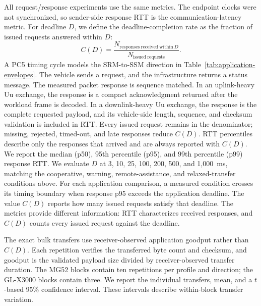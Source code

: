 All request/response experiments use the same metrics. The endpoint clocks were not
synchronized, so sender-side response RTT is the
communication-latency metric. For deadline $D$, we define the deadline-completion
rate as the fraction of issued requests answered within $D$:
\begin{equation}
 C(D)=
 \frac{N_{\mathrm{responses\ received\ within}\ D}}
 {N_{\mathrm{issued\ requests}}}.
 \label{eq:deadline-completion}
\end{equation}
A PC5 timing cycle models the SRM-to-SSM direction in
Table~\ref{tab:application-envelopes}. The vehicle sends a request, and the
infrastructure returns a status message. The measured packet response is
sequence matched. In an uplink-heavy Uu exchange, the response is a compact
acknowledgment returned after the workload frame is decoded. In a
downlink-heavy Uu exchange, the response is the complete requested payload, and
its vehicle-side length, sequence, and checksum validation is included in RTT.
Every issued request remains in the denominator; missing,
rejected, timed-out, and late responses reduce $C(D)$. RTT
percentiles describe only the responses that arrived and are always reported
with $C(D)$. We report the median (p50), 95th percentile (p95), and 99th
percentile (p99) response RTT. We evaluate $D$ at 3, 10, 25, 100, 200, 500, and 1,000~ms, matching
the cooperative, warning, remote-assistance, and relaxed-transfer conditions
above. For each application comparison, a measured condition crosses its timing
boundary when response p95 exceeds the application deadline. The value $C(D)$
reports how many issued requests satisfy that deadline. The metrics provide
different information: RTT characterizes received responses, and $C(D)$ counts
every issued request against the deadline.

The exact bulk transfers use receiver-observed application goodput rather than
$C(D)$. Each repetition verifies the transferred byte count and checksum, and
goodput is the validated payload size divided by receiver-observed transfer
duration. The MG52 blocks contain ten repetitions per profile and direction;
the GL-X3000 blocks contain three. We report
the individual transfers, mean, and a $t$-based 95\% confidence interval.
These intervals describe within-block transfer variation.
